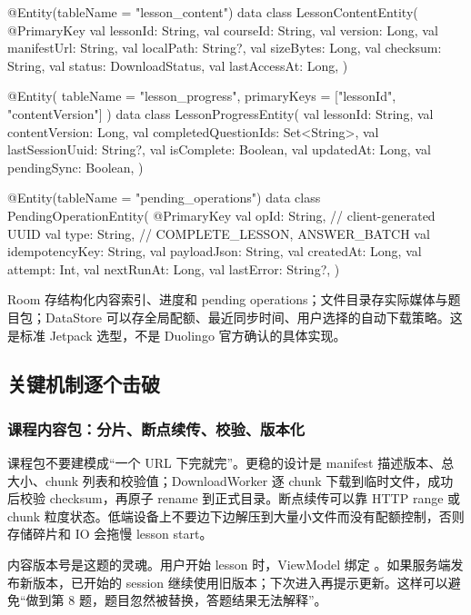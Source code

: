\begin{kotlin}
@Entity(tableName = "lesson_content")
data class LessonContentEntity(
    @PrimaryKey val lessonId: String,
    val courseId: String,
    val version: Long,
    val manifestUrl: String,
    val localPath: String?,
    val sizeBytes: Long,
    val checksum: String,
    val status: DownloadStatus,
    val lastAccessAt: Long,
)

@Entity(
    tableName = "lesson_progress",
    primaryKeys = ["lessonId", "contentVersion"]
)
data class LessonProgressEntity(
    val lessonId: String,
    val contentVersion: Long,
    val completedQuestionIds: Set<String>,
    val lastSessionUuid: String?,
    val isComplete: Boolean,
    val updatedAt: Long,
    val pendingSync: Boolean,
)

@Entity(tableName = "pending_operations")
data class PendingOperationEntity(
    @PrimaryKey val opId: String,          // client-generated UUID
    val type: String,                      // COMPLETE_LESSON, ANSWER_BATCH
    val idempotencyKey: String,
    val payloadJson: String,
    val createdAt: Long,
    val attempt: Int,
    val nextRunAt: Long,
    val lastError: String?,
)
\end{kotlin}

Room 存结构化内容索引、进度和 pending operations；文件目录存实际媒体与题目包；DataStore 可以存全局配额、最近同步时间、用户选择的自动下载策略。\srcinferred 这是标准 Jetpack 选型，不是 Duolingo 官方确认的具体实现。

\subsection{关键机制逐个击破}

\subsubsection{课程内容包：分片、断点续传、校验、版本化}

课程包不要建模成“一个 URL 下完就完”。更稳的设计是 manifest 描述版本、总大小、chunk 列表和校验值；DownloadWorker 逐 chunk 下载到临时文件，成功后校验 checksum，再原子 rename 到正式目录。断点续传可以靠 HTTP range 或 chunk 粒度状态。低端设备上不要边下边解压到大量小文件而没有配额控制，否则存储碎片和 IO 会拖慢 lesson start。

内容版本号是这题的灵魂。用户开始 lesson 时，ViewModel 绑定 。如果服务端发布新版本，已开始的 session 继续使用旧版本；下次进入再提示更新。这样可以避免“做到第 8 题，题目忽然被替换，答题结果无法解释”。


